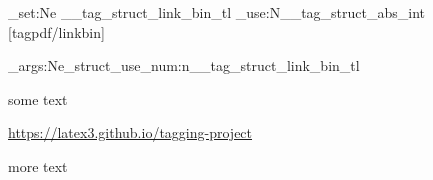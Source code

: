 \documentclass{article}
\begin{document}
\ExplSyntaxOn\makeatletter
{}
\tl_set:Ne \g__tag_struct_link_bin_tl {\int_use:N\c@g__tag_struct_abs_int}%
\tagstructend
{}[tagpdf/linkbin]
  {\par{}\exp_args:Ne\tag_struct_use_num:n{\g__tag_struct_link_bin_tl}\tagstructend}
\ExplSyntaxOff\makeatother
some text 


\SuspendTagging{}%
\url{https://latex3.github.io/tagging-project}\par\ResumeTagging{}\tagmcend\tagstructend 

more text
\end{document}
